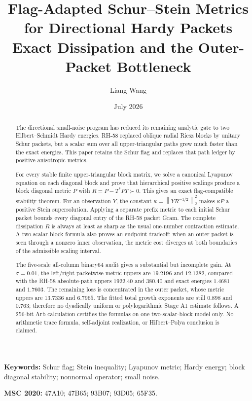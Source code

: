 \documentclass[11pt]{article}
\title{Flag-Adapted Schur--Stein Metrics for Directional Hardy Packets\\
\large Exact Dissipation and the Outer-Packet Bottleneck}
\author{Liang Wang}
\date{July 2026}
\theoremstyle{remark}
\newcommand{\norm}[1]{\left\lVert#1\right\rVert}
\begin{document}
\maketitle

\begin{abstract}
The directional small-noise program has reduced its remaining analytic gate
to two Hilbert--Schmidt Hardy energies.  RH-58 replaced oblique radial Riesz
blocks by unitary Schur packets, but a scalar sum over all upper-triangular
paths grew much faster than the exact energies.  This paper retains the
Schur flag and replaces that path ledger by positive anisotropic metrics.

For every stable finite upper-triangular block matrix, we solve a canonical
Lyapunov equation on each diagonal block and prove that hierarchical positive
scalings produce a block diagonal metric $P$ with
$R=P-T^*PT\succ0$.  This gives an exact flag-compatible stability theorem.
For an observation $Y$, the constant
$\kappa=\norm{YR^{-1/2}}_2^2$ makes $\kappa P$ a positive Stein
supersolution.  Applying a separate prefix metric to each initial Schur
packet bounds every diagonal entry of the RH-58 packet Gram.  The complete
dissipation $R$ is always at least as sharp as the usual one-number
contraction estimate.  A two-scalar-block formula also proves an endpoint
tradeoff: when an outer packet is seen through a nonzero inner observation,
the metric cost diverges at both boundaries of the admissible scaling
interval.

The five-scale all-column binary64 audit gives a substantial but incomplete
gain.  At $\sigma=0.01$, the left/right packetwise metric uppers are $19.2196$
and $12.1382$, compared with the RH-58 absolute-path uppers $1922.40$ and
$380.40$ and exact energies $1.4681$ and $1.7603$.  The remaining loss is
concentrated in the outer packet, whose metric uppers are $13.7336$ and
$6.7965$.  The fitted total growth exponents are still $0.898$ and $0.763$;
therefore no dyadically uniform or polylogarithmic Stage A1 estimate follows.
A 256-bit Arb calculation certifies the formulas on one two-scalar-block
model only.  No arithmetic trace formula, self-adjoint realization, or
Hilbert--Polya conclusion is claimed.
\end{abstract}

\noindent\textbf{Keywords:} Schur flag; Stein inequality; Lyapunov metric;
Hardy energy; block diagonal stability; nonnormal operator; small noise.

\medskip
\noindent\textbf{MSC 2020:} 47A10; 47B65; 93B07; 93D05; 65F35.
\end{document}
